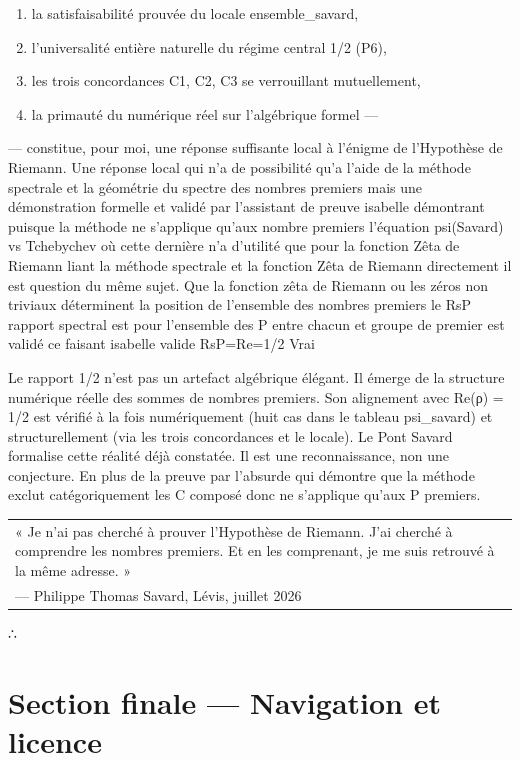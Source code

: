 \documentclass[11pt,a4paper]{article}
\begin{document}
\begin{enumerate}[leftmargin=*]
\item la satisfaisabilité prouvée du locale ensemble\_savard,
\item l'universalité entière naturelle du régime central 1/2 (P6),
\item les trois concordances C1, C2, C3 se verrouillant mutuellement,
\item la primauté du numérique réel sur l'algébrique formel —
\end{enumerate}
— constitue, pour moi, une réponse suffisante local à l'énigme de l'Hypothèse de Riemann. Une réponse local qui n'a de possibilité qu'a l'aide de la méthode spectrale et la géométrie du spectre des nombres premiers mais une démonstration formelle et validé par l'assistant de preuve isabelle démontrant puisque la méthode ne s'applique qu'aux nombre premiers l'équation psi(Savard) vs Tchebychev où cette dernière n'a d'utilité que pour la fonction Zêta de Riemann liant la méthode spectrale et la fonction Zêta de Riemann directement il est question du même sujet. Que la fonction zêta de Riemann ou les zéros non triviaux déterminent la position de l'ensemble des nombres premiers le RsP rapport spectral est pour l'ensemble des P entre chacun et groupe de premier est validé ce faisant isabelle valide RsP=Re=1/2 Vrai

Le rapport 1/2 n'est pas un artefact algébrique élégant. Il émerge de la structure numérique réelle des sommes de nombres premiers. Son alignement avec Re(ρ) = 1/2 est vérifié à la fois numériquement (huit cas dans le tableau psi\_savard) et structurellement (via les trois concordances et le locale). Le Pont Savard formalise cette réalité déjà constatée. Il est une reconnaissance, non une conjecture. En plus de la preuve par l'absurde qui démontre que la méthode exclut catégoriquement les C composé donc ne s'applique qu'aux P premiers.


\begin{longtable}{|p{}|}
\hline
« Je n'ai pas cherché à prouver l'Hypothèse de Riemann. J'ai cherché à comprendre les nombres premiers. Et en les comprenant, je me suis retrouvé à la même adresse. » \\ — Philippe Thomas Savard, Lévis, juillet 2026 \\
\hline
\end{longtable}


∴

\section{Section finale — Navigation et licence}
\end{document}
